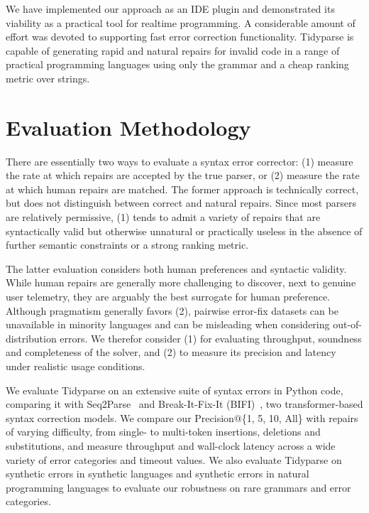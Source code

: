 \documentclass[sigplan,screen]{acmart}
\begin{document}
We have implemented our approach as an IDE plugin and demonstrated its viability as a practical tool for realtime programming. A considerable amount of effort was devoted to supporting fast error correction functionality. Tidyparse is capable of generating rapid and natural repairs for invalid code in a range of practical programming languages using only the grammar and a cheap ranking metric over strings.


\section{Evaluation Methodology}


There are essentially two ways to evaluate a syntax error corrector: (1) measure the rate at which repairs are accepted by the true parser, or (2) measure the rate at which human repairs are matched. The former approach is technically correct, but does not distinguish between correct and natural repairs. Since most parsers are relatively permissive, (1) tends to admit a variety of repairs that are syntactically valid but otherwise unnatural or practically useless in the absence of further semantic constraints or a strong ranking metric.

The latter evaluation considers both human preferences and syntactic validity. While human repairs are generally more challenging to discover, next to genuine user telemetry, they are arguably the best surrogate for human preference. Although pragmatism generally favors (2), pairwise error-fix datasets can be unavailable in minority languages and can be misleading when considering out-of-distribution errors. We therefor consider (1) for evaluating throughput, soundness and completeness of the solver, and (2) to measure its precision and latency under realistic usage conditions.

We evaluate Tidyparse on an extensive suite of syntax errors in Python code, comparing it with Seq2Parse~\cite{sakkas2022seq2parse} and Break-It-Fix-It (BIFI)~\cite{yasunaga2021break}, two transformer-based syntax correction models. We compare our Precision@\{1, 5, 10, All\} with repairs of varying difficulty, from single- to multi-token insertions, deletions and substitutions, and measure throughput and wall-clock latency across a wide variety of error categories and timeout values. We also evaluate Tidyparse on synthetic errors in synthetic languages and synthetic errors in natural programming languages to evaluate our robustness on rare grammars and error categories.
\end{document}
